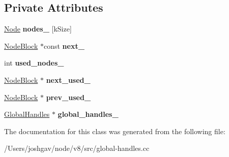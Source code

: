 \subsection*{Private Attributes}
\begin{DoxyCompactItemize}
\item 
\hyperlink{classv8_1_1internal_1_1_global_handles_1_1_node}{Node} {\bfseries nodes\+\_\+} \mbox{[}k\+Size\mbox{]}\hypertarget{classv8_1_1internal_1_1_global_handles_1_1_node_block_ad0fe2b0ea126c5d6dc7b7420c7be824b}{}\label{classv8_1_1internal_1_1_global_handles_1_1_node_block_ad0fe2b0ea126c5d6dc7b7420c7be824b}

\item 
\hyperlink{classv8_1_1internal_1_1_global_handles_1_1_node_block}{Node\+Block} $\ast$const {\bfseries next\+\_\+}\hypertarget{classv8_1_1internal_1_1_global_handles_1_1_node_block_a4ff85c21ce2a2d2fb9a818e8aaf7ba45}{}\label{classv8_1_1internal_1_1_global_handles_1_1_node_block_a4ff85c21ce2a2d2fb9a818e8aaf7ba45}

\item 
int {\bfseries used\+\_\+nodes\+\_\+}\hypertarget{classv8_1_1internal_1_1_global_handles_1_1_node_block_a86f99a1acb554dc22412e9ca032bef3e}{}\label{classv8_1_1internal_1_1_global_handles_1_1_node_block_a86f99a1acb554dc22412e9ca032bef3e}

\item 
\hyperlink{classv8_1_1internal_1_1_global_handles_1_1_node_block}{Node\+Block} $\ast$ {\bfseries next\+\_\+used\+\_\+}\hypertarget{classv8_1_1internal_1_1_global_handles_1_1_node_block_a89adb16ce85e2aaed30d754af4882c0e}{}\label{classv8_1_1internal_1_1_global_handles_1_1_node_block_a89adb16ce85e2aaed30d754af4882c0e}

\item 
\hyperlink{classv8_1_1internal_1_1_global_handles_1_1_node_block}{Node\+Block} $\ast$ {\bfseries prev\+\_\+used\+\_\+}\hypertarget{classv8_1_1internal_1_1_global_handles_1_1_node_block_ab8da7ecf514a59ded10c6a54dc772b4e}{}\label{classv8_1_1internal_1_1_global_handles_1_1_node_block_ab8da7ecf514a59ded10c6a54dc772b4e}

\item 
\hyperlink{classv8_1_1internal_1_1_global_handles}{Global\+Handles} $\ast$ {\bfseries global\+\_\+handles\+\_\+}\hypertarget{classv8_1_1internal_1_1_global_handles_1_1_node_block_aec3c0a06de3ccb98b1b456632625fc47}{}\label{classv8_1_1internal_1_1_global_handles_1_1_node_block_aec3c0a06de3ccb98b1b456632625fc47}

\end{DoxyCompactItemize}


The documentation for this class was generated from the following file\+:\begin{DoxyCompactItemize}
\item 
/\+Users/joshgav/node/v8/src/global-\/handles.\+cc\end{DoxyCompactItemize}

